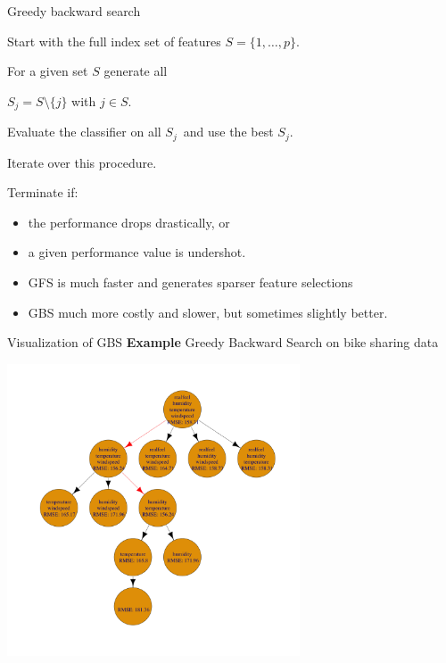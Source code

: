 \documentclass[11pt,compress,t,notes=noshow, xcolor=table]{beamer}
\begin{document}
\begin{vbframe}{Greedy backward search}

    \begin{blocki}{}
      \item Start with the full index set of features $S = \{1, \ldots, p\}$.
      \item For a given set $S$ generate all

      $S_j = S \setminus\{j\}$ with $j \in S$.
      \item Evaluate the classifier on all $S_j$\
        and use the best $S_j$.
      \item Iterate over this procedure.
      \item Terminate if:
        \begin{itemize}
          \item the performance drops drastically, or
          \item a given performance value is undershot.
        \end{itemize}
      \end{blocki}

      \begin{itemize}
          \item GFS is much faster and generates sparser feature selections
          \item GBS much more costly and slower, but sometimes slightly better.
      \end{itemize}
    
  \end{vbframe}

  \begin{frame}{Visualization of GBS}    
    \textbf{Example} Greedy Backward Search on bike sharing data
    \begin{center}
      \includegraphics[width = 0.65\textwidth]{figure/fs-wrappers-backwards-powerset-tree-4.png}
      \end{center}
\end{frame}
\end{document}
